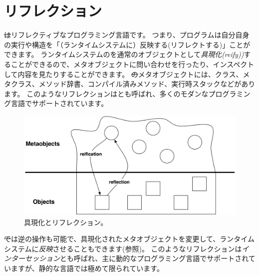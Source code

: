 \documentclass[a4paper,10pt,twoside]{book}
\begin{document}
	\renewcommand{\nnbb}[2]{} %
	\sloppy
\fi

\chapter{リフレクション}


\st はリフレクティブなプログラミング言語です。
つまり、プログラムは自分自身の実行や構造を「（ランタイムシステムに）反映する(リフレクトする)」ことができます。
ランタイムシステムのを通常のオブジェクトとして\emph{具現化(reify))}することができるので、メタオブジェクトに問い合わせを行ったり、インスペクトして内容を見たりすることができます。
\st のメタオブジェクトには、クラス、メタクラス、メソッド辞書、コンパイル済みメソッド、実行時スタックなどがあります。
このようなリフレクションはとも呼ばれ、多くのモダンなプログラミング言語でサポートされています。

\begin{figure}[ht]\centering
	\includegraphics[width=\linewidth]{reflect}
	\caption{具現化とリフレクション。} %
\end{figure}

\st では逆の操作も可能で、具現化されたメタオブジェクトを変更して、ランタイムシステムに\emph{反映}させることもできます(参照)。
このようなリフレクションは\emph{インターセッション}とも呼ばれ、主に動的なプログラミング言語でサポートされていますが、静的な言語では極めて限られています。
\end{document}
